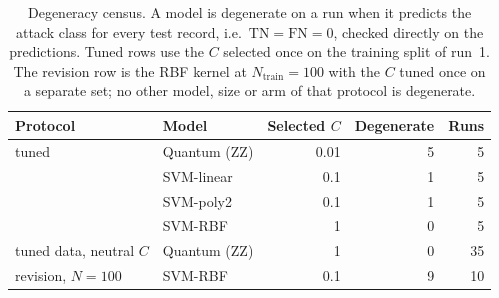 \begin{table}[t]
\centering
\caption{Degeneracy census. A model is degenerate on a run when it
predicts the attack class for every test record, i.e.\ $\mathrm{TN}
= \mathrm{FN} = 0$, checked directly on the predictions. Tuned rows
use the $C$ selected once on the training split of run~1. The
revision row is the RBF kernel at $N_{\text{train}} = 100$ with the
$C$ tuned once on a separate set; no other model, size or arm of
that protocol is degenerate.}
\label{tab:degeneracy}
\begin{tabular}{l@{\hskip 1.2em}l@{\hskip 1.4em}r@{\hskip 1.4em}r@{\hskip 1.2em}r}
\toprule
Protocol & Model & Selected $C$ & Degenerate & Runs \\
\midrule
tuned & Quantum (ZZ) & 0.01 & 5 & 5 \\
 & SVM-linear & 0.1 & 1 & 5 \\
 & SVM-poly2 & 0.1 & 1 & 5 \\
 & SVM-RBF & 1 & 0 & 5 \\
\addlinespace[2pt]
tuned data, neutral $C$ & Quantum (ZZ) & 1 & 0 & 35 \\
\addlinespace[2pt]
revision, $N=100$ & SVM-RBF & 0.1 & 9 & 10 \\
\bottomrule
\end{tabular}
\end{table}
